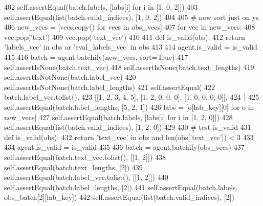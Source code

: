 \begin{DoxyCode}
402             self.assertEqual(batch.labels, [labs[i] \textcolor{keywordflow}{for} i \textcolor{keywordflow}{in} [1, 0, 2]])
403             self.assertEqual(list(batch.valid\_indices), [1, 0, 2])
404 
405             \textcolor{comment}{# now sort just on ys}
406             new\_vecs = [vecs.copy() \textcolor{keywordflow}{for} vecs \textcolor{keywordflow}{in} obs\_vecs]
407             \textcolor{keywordflow}{for} vec \textcolor{keywordflow}{in} new\_vecs:
408                 vec.pop(\textcolor{stringliteral}{'text'})
409                 vec.pop(\textcolor{stringliteral}{'text\_vec'})
410 
411             \textcolor{keyword}{def }is\_valid(obs):
412                 \textcolor{keywordflow}{return} \textcolor{stringliteral}{'labels\_vec'} \textcolor{keywordflow}{in} obs \textcolor{keywordflow}{or} \textcolor{stringliteral}{'eval\_labels\_vec'} \textcolor{keywordflow}{in} obs
413 
414             agent.is\_valid = is\_valid
415 
416             batch = agent.batchify(new\_vecs, sort=\textcolor{keyword}{True})
417             self.assertIsNone(batch.text\_vec)
418             self.assertIsNone(batch.text\_lengths)
419             self.assertIsNotNone(batch.label\_vec)
420             self.assertIsNotNone(batch.label\_lengths)
421             self.assertEqual(
422                 batch.label\_vec.tolist(),
423                 [[1, 2, 3, 4, 5], [1, 2, 0, 0, 0], [1, 0, 0, 0, 0]],
424             )
425             self.assertEqual(batch.label\_lengths, [5, 2, 1])
426             labs = [o[lab\_key][0] \textcolor{keywordflow}{for} o \textcolor{keywordflow}{in} new\_vecs]
427             self.assertEqual(batch.labels, [labs[i] \textcolor{keywordflow}{for} i \textcolor{keywordflow}{in} [1, 2, 0]])
428             self.assertEqual(list(batch.valid\_indices), [1, 2, 0])
429 
430             \textcolor{comment}{# test is\_valid}
431             \textcolor{keyword}{def }is\_valid(obs):
432                 \textcolor{keywordflow}{return} \textcolor{stringliteral}{'text\_vec'} \textcolor{keywordflow}{in} obs \textcolor{keywordflow}{and} len(obs[\textcolor{stringliteral}{'text\_vec'}]) < 3
433 
434             agent.is\_valid = is\_valid
435 
436             batch = agent.batchify(obs\_vecs)
437             self.assertEqual(batch.text\_vec.tolist(), [[1, 2]])
438             self.assertEqual(batch.text\_lengths, [2])
439             self.assertEqual(batch.label\_vec.tolist(), [[1, 2]])
440             self.assertEqual(batch.label\_lengths, [2])
441             self.assertEqual(batch.labels, obs\_batch[2][lab\_key])
442             self.assertEqual(list(batch.valid\_indices), [2])

\end{DoxyCode}
